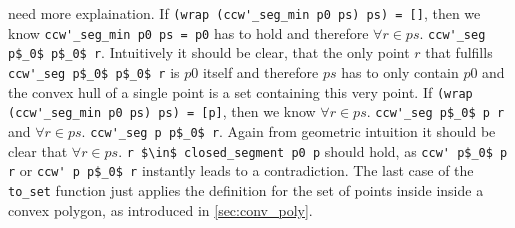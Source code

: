 need more explaination. If \lstinline|(wrap (ccw'_seg_min p0 ps) ps) = []|, then we know
\lstinline|ccw'_seg_min p0 ps = p0| has to hold and therefore $\forall r \in ps.$ \lstinline|ccw'_seg p$_0$ p$_0$ r|.
Intuitively it should be clear, that the only point $r$ that fulfills \lstinline|ccw'_seg p$_0$ p$_0$ r| is $p0$ itself
and therefore $ps$ has to only contain $p0$ and the convex hull of a single point is a set containing this
very point. If \lstinline|(wrap (ccw'_seg_min p0 ps) ps) = [p]|, then we know 
$\forall r \in ps.$ \lstinline|ccw'_seg p$_0$ p r| and $\forall r \in ps.$ \lstinline|ccw'_seg p p$_0$ r|.
Again from geometric intuition it should be clear that  $\forall r \in ps.$ \lstinline|r $\in$ closed_segment p0 p|
should hold, as \lstinline|ccw' p$_0$ p r| or \lstinline|ccw' p p$_0$ r| instantly leads to a contradiction.
The last case of the \lstinline|to_set| function just applies the definition for the 
set of points inside inside a convex polygon, as introduced in \ref*{sec:conv_poly}. 
